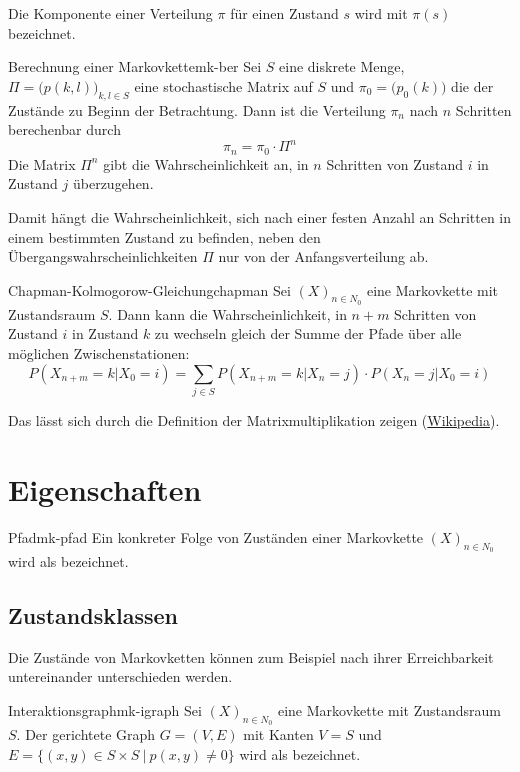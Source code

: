 Die Komponente einer Verteilung $\pi$ für einen Zustand $s$ wird mit $\pi(s)$
bezeichnet.

\begin{theorem}{Berechnung einer Markovkette}{mk-ber}
Sei $S$ eine diskrete Menge, $\Pi = \big(p(k,l)\big)_{k,l\in S}$ eine
stochastische Matrix auf $S$ und $\pi_0 = \big(p_0(k)\big)$ die
 der Zustände zu Beginn der Betrachtung. Dann ist
die Verteilung $\pi_n$ nach $n$ Schritten berechenbar durch
\[
\pi_n = \pi_0\cdot\Pi^n
\]
Die Matrix $\Pi^n$ gibt die Wahrscheinlichkeit an, in $n$ Schritten von
Zustand $i$ in Zustand $j$ überzugehen.
\end{theorem}

Damit hängt die Wahrscheinlichkeit, sich nach einer festen Anzahl an Schritten
in einem bestimmten Zustand zu befinden, neben den Übergangswahrscheinlichkeiten
$\Pi$ nur von der Anfangsverteilung ab.

\begin{theorem}{Chapman-Kolmogorow-Gleichung}{chapman}
Sei $(X)_{n\in N_0}$ eine Markovkette mit Zustandsraum $S$. Dann kann die
Wahrscheinlichkeit, in $n+m$ Schritten von Zustand $i$ in Zustand $k$ zu
wechseln gleich der Summe der Pfade über alle möglichen Zwischenstationen:
\[
P(X_{n+m}=k|X_0=i) = \sum_{j\in S}P(X_{n+m}=k|X_n=j)\cdot P(X_n=j|X_0=i)
\]
\end{theorem}

Das lässt sich durch die Definition der Matrixmultiplikation zeigen
(\href{https://de.wikipedia.org/wiki/Chapman-Kolmogorow-Gleichung}{Wikipedia}).

\section{Eigenschaften}

\begin{definition}{Pfad}{mk-pfad}
Ein konkreter Folge von Zuständen einer Markovkette $(X)_{n\in N_0}$ wird
als  bezeichnet.
\end{definition}

\subsection{Zustandsklassen}

Die Zustände von Markovketten können zum Beispiel nach ihrer Erreichbarkeit
untereinander unterschieden werden.

\begin{definition}{Interaktionsgraph}{mk-igraph}
Sei $(X)_{n\in N_0}$ eine Markovkette mit Zustandsraum $S$. Der gerichtete Graph
$G=(V,E)$ mit Kanten $V=S$ und $E = \{(x,y) \in S\times S\ |\ p(x,y) \ne 0\}$ wird
als  bezeichnet.
\end{definition}


